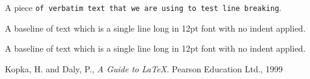 \documentclass[12pt,a4paper,onecolumn]{article}
\begin{document}
\bigskip
A piece \verb=of verbatim text that we are using to test line breaking=.


\bigskip

\noindent
A baseline of text which is a single line long in 12pt font with no indent applied.

\vspace{4\baselineskip}

\noindent
A baseline of text which is a single line long in 12pt font with no indent applied.\marginpar{\rule[-1ex]{0.3em}{4ex}}

\begin{thebibliography}{99}
 Kopka, H. and Daly, P., \textit{A Guide to \LaTeX}. Pearson Education Ltd., 1999
\end{thebibliography}
\end{document}
